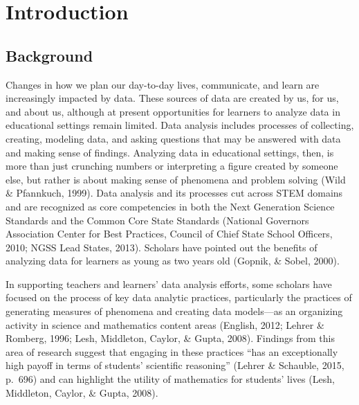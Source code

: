 \documentclass[]{msu-thesis}
\theoremstyle{definition}
\theoremstyle{definition}
\theoremstyle{definition}
\theoremstyle{remark}
\begin{document}
\SingleSpacing
\tableofcontents* %
\clearpage
\listoftables %
\clearpage
\listoffigures %
\mainmatter
%

\chapter{Introduction}\label{intro}

\section{Background}\label{background}

\DoubleSpacing

Changes in how we plan our day-to-day lives, communicate, and learn are
increasingly impacted by data. These sources of data are created by us,
for us, and about us, although at present opportunities for learners to
analyze data in educational settings remain limited. Data analysis
includes processes of collecting, creating, modeling data, and asking
questions that may be answered with data and making sense of findings.
Analyzing data in educational settings, then, is more than just
crunching numbers or interpreting a figure created by someone else, but
rather is about making sense of phenomena and problem solving (Wild \&
Pfannkuch, 1999). Data analysis and its processes cut across STEM
domains and are recognized as core competencies in both the Next
Generation Science Standards and the Common Core State Standards
(National Governors Association Center for Best Practices, Council of
Chief State School Officers, 2010; NGSS Lead States, 2013). Scholars
have pointed out the benefits of analyzing data for learners as young as
two years old (Gopnik, \& Sobel, 2000).

In supporting teachers and learners' data analysis efforts, some
scholars have focused on the process of key data analytic practices,
particularly the practices of generating measures of phenomena and
creating data models---as an organizing activity in science and
mathematics content areas (English, 2012; Lehrer \& Romberg, 1996; Lesh,
Middleton, Caylor, \& Gupta, 2008). Findings from this area of research
suggest that engaging in these practices ``has an exceptionally high
payoff in terms of students' scientific reasoning'' (Lehrer \& Schauble,
2015, p.~696) and can highlight the utility of mathematics for students'
lives (Lesh, Middleton, Caylor, \& Gupta, 2008).
\end{document}
